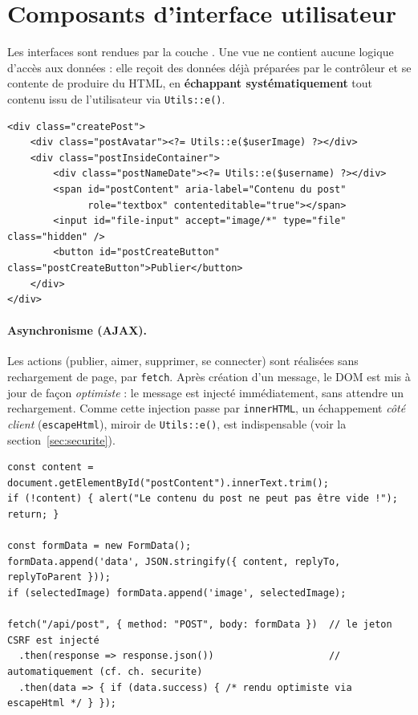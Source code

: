 \section{Composants d'interface utilisateur}
\label{sec:interfaces}

Les interfaces sont rendues par la couche . Une vue ne contient aucune
logique d'accès aux données : elle reçoit des données déjà préparées par le contrôleur et se
contente de produire du HTML, en \textbf{échappant systématiquement} tout contenu issu de
l'utilisateur via \texttt{Utils::e()}.

\begin{lstlisting}[style=php, caption={Vue du formulaire de publication (extrait) — \file{modules/views/CreatePostView.php}}]
<div class="createPost">
    <div class="postAvatar"><?= Utils::e($userImage) ?></div>
    <div class="postInsideContainer">
        <div class="postNameDate"><?= Utils::e($username) ?></div>
        <span id="postContent" aria-label="Contenu du post"
              role="textbox" contenteditable="true"></span>
        <input id="file-input" accept="image/*" type="file" class="hidden" />
        <button id="postCreateButton" class="postCreateButton">Publier</button>
    </div>
</div>
\end{lstlisting}

\paragraph{Asynchronisme (AJAX).} Les actions (publier, aimer, supprimer, se connecter) sont
réalisées sans rechargement de page, par \texttt{fetch}. Après création d'un message, le DOM est
mis à jour de façon \emph{optimiste} : le message est injecté immédiatement, sans attendre un
rechargement. Comme cette injection passe par \texttt{innerHTML}, un échappement \emph{côté
client} (\texttt{escapeHtml}), miroir de \texttt{Utils::e()}, est indispensable (voir la
section~\ref{sec:securite}).

\begin{lstlisting}[style=js, caption={Création d'un message par \texttt{fetch} — \file{public/scripts/index.js}}]
const content = document.getElementById("postContent").innerText.trim();
if (!content) { alert("Le contenu du post ne peut pas être vide !"); return; }

const formData = new FormData();
formData.append('data', JSON.stringify({ content, replyTo, replyToParent }));
if (selectedImage) formData.append('image', selectedImage);

fetch("/api/post", { method: "POST", body: formData })  // le jeton CSRF est injecté
  .then(response => response.json())                    // automatiquement (cf. ch. securite)
  .then(data => { if (data.success) { /* rendu optimiste via escapeHtml */ } });
\end{lstlisting}

